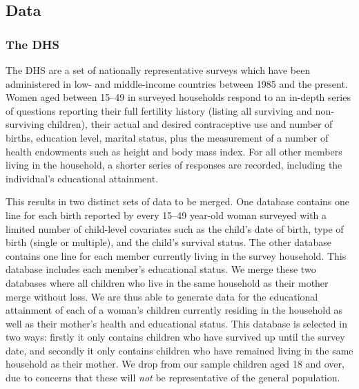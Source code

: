 \documentclass[subeqn]{article}
\begin{document}
\begin{spacing}{1.4}
\subsection{Data}                                  \label{TWINsscn:data}
\subsubsection{The DHS}
The DHS are a set of nationally representative surveys which have been 
administered in low- and middle-income countries between 1985 and the present. 
Women aged between 15--49 in surveyed households respond to an in-depth series 
of questions reporting their full fertility history (listing all surviving and 
non-surviving children), their actual and desired contraceptive use and number 
of births, education level, marital status, plus the measurement of a number of 
health endowments such as height and body mass index. For all other members 
living in the household, a shorter series of responses are recorded, including 
the individual's educational attainment.

This results in two distinct sets of data to be merged. One database contains 
one line for each birth reported by every 15--49 year-old woman surveyed with a 
limited number of child-level covariates such as the child's date of birth, type 
of birth (single or multiple), and the child's survival status. The other 
database contains one line for each member currently living in the survey
household. This database includes each member's educational status. We merge
these two databases where all children who live in the same household as their 
mother merge without loss.  We are thus able to generate data for the educational 
attainment of each of a woman's children currently residing in the household as 
well as their mother's health and educational status. This database is selected in 
two ways: firstly it only contains children who have survived up until the survey 
date, and secondly it only contains children who have remained living in the same 
household as their mother. We drop from our sample children aged 18 and over, due
to concerns that these will \emph{not} be representative of the general 
population.


\end{spacing}
\end{document}
